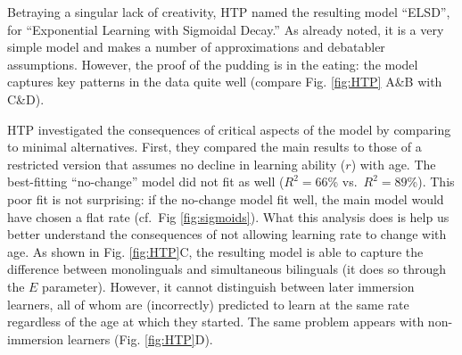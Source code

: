 \documentclass[
  english,
  doc,floatsintext]{apa6}
\begin{document}
Betraying a singular lack of creativity, HTP named the resulting model ``ELSD'', for ``Exponential Learning with Sigmoidal Decay.'' As already noted, it is a very simple model and makes a number of approximations and debatabler assumptions. However, the proof of the pudding is in the eating: the model captures key patterns in the data quite well (compare Fig. \ref{fig:HTP} A\&B with C\&D).

HTP investigated the consequences of critical aspects of the model by comparing to minimal alternatives. First, they compared the main results to those of a restricted version that assumes no decline in learning ability (\(r\)) with age. The best-fitting ``no-change'' model did not fit as well (\(R^2=66\)\% vs.~\(R^2=89\)\%). This poor fit is not surprising: if the no-change model fit well, the main model would have chosen a flat rate (cf.~Fig \ref{fig:sigmoids}). What this analysis does is help us better understand the consequences of not allowing learning rate to change with age. As shown in Fig. \ref{fig:HTP}C, the resulting model is able to capture the difference between monolinguals and simultaneous bilinguals (it does so through the \(E\) parameter). However, it cannot distinguish between later immersion learners, all of whom are (incorrectly) predicted to learn at the same rate regardless of the age at which they started. The same problem appears with non-immersion learners (Fig. \ref{fig:HTP}D).
\end{document}
